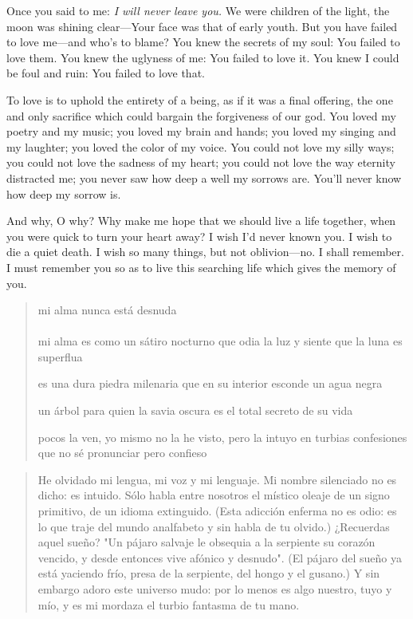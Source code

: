 \documentclass[a4paper, 12pt]{article}
\begin{document}
Once you said to me: \textit{I will never leave you.} We were children of the
light, the moon was shining clear---Your face was that of early youth. But you
have failed to love me---and who's to blame? You knew the secrets of my soul:
You failed to love them. You knew the uglyness of me: You failed to love it. You
knew I could be foul and ruin: You failed to love that.

To love is to uphold the entirety of a being, as if it was a final offering,
the one and only sacrifice which could bargain the forgiveness of our god.
You loved my poetry and my music;
you loved my brain and hands; you loved my singing and my laughter; you loved
the color of my voice. You could not love my silly ways; you could not love the
sadness of my heart; you could not love the way eternity distracted me; you never
saw how deep a well my sorrows are. You'll never know how deep my sorrow is.

And why, O why? Why make me hope that we should live a life together, when you
were quick to turn your heart away? I wish I'd never known you. I wish to die a
quiet death. I wish so many things, but not oblivion---no. I shall remember. I
must remember you so as to live this searching life which gives the memory of
you. 

\pagebreak 

\begin{verse}
    
mi alma nunca está desnuda\\

\\ 

mi alma es como un sátiro nocturno
que odia la luz y siente que la luna es superflua

es una dura piedra milenaria
que en su interior esconde un agua negra

un árbol para quien la savia oscura
es el total secreto de su vida

pocos la ven, yo mismo no la he visto,
pero la intuyo en turbias confesiones
que no sé pronunciar pero confieso




\end{verse}

\pagebreak

\begin{verse}
    He olvidado mi lengua, mi voz y mi lenguaje.
    Mi nombre silenciado no es dicho: es intuido.
    Sólo habla entre nosotros el místico oleaje 
    de un signo primitivo, de un idioma extinguido.
    (Esta adicción enferma no es odio: es lo que traje
    del mundo analfabeto y sin habla de tu olvido.)
    ¿Recuerdas aquel sueño? "Un pájaro salvaje 
    le obsequia a la serpiente su corazón vencido,
    y desde entonces vive afónico y desnudo".
    (El pájaro del sueño ya está yaciendo frío,
    presa de la serpiente, del hongo y el gusano.)
    Y sin embargo adoro este universo mudo:
    por lo menos es algo nuestro, tuyo y mío,
    y es mi mordaza el turbio fantasma de tu mano.
    \end{verse}
\end{document}
